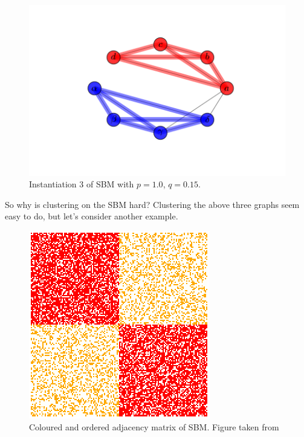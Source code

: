 \begin{figure}[h]
  \includegraphics[width=\linewidth]{labels_and_colors_3.png}
  \caption{Instantiation 3 of SBM with $p=1.0$, $q=0.15$.}\label{fig:awesome_image3}
\endminipage
\end{figure}


So why is clustering on the SBM hard?  Clustering the above three graphs seem easy to do, but let's consider another example.  

\begin{figure}[h]
\begin{center}
  \includegraphics[scale=0.5]{SBM}
  \caption{Coloured and ordered adjacency matrix of SBM. Figure taken from \cite{SBM_adjacency_talk}}
  \label{fig:SBM_matrix_colour}
 \end{center}
\end{figure}

